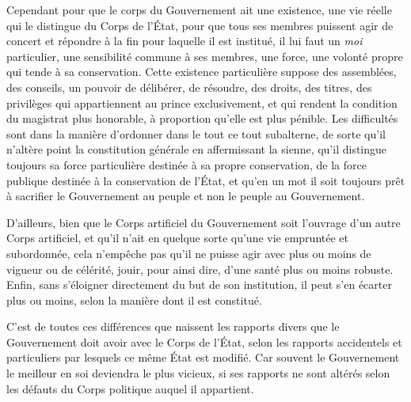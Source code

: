 \documentclass[french,twoside]{book} %
\begin{document}
Cependant pour que le corps du Gouvernement ait une existence, une vie réelle qui le distingue du Corps de l’État, pour que tous ses membres puissent agir de concert et répondre à la fin pour laquelle il est institué, il lui faut un {\itshape moi} particulier, une sensibilité commune à ses membres, une force, une volonté propre qui tende à sa conservation. Cette existence particulière suppose des assemblées, des conseils, un pouvoir de délibérer, de résoudre, des droits, des titres, des privilèges qui appartiennent au prince exclusivement, et qui rendent la condition du magistrat plus honorable, à proportion qu’elle est plus pénible. Les difficultés sont dans la manière d’ordonner dans le tout ce tout subalterne, de sorte qu’il n’altère point la constitution générale en affermissant la sienne, qu’il distingue toujours sa force particulière destinée à sa propre conservation, de la force publique destinée à la conservation de l’État, et qu’en un mot il soit toujours prêt à sacrifier le Gouvernement au peuple et non le peuple au Gouvernement.\par
D’ailleurs, bien que le Corps artificiel du Gouvernement soit l’ouvrage d’un autre Corps artificiel, et qu’il n’ait en quelque sorte qu’une vie empruntée et subordonnée, cela n’empêche pas qu’il ne puisse agir avec plus ou moins de vigueur ou de célérité, jouir, pour ainsi dire, d’une santé plus ou moins robuste. Enfin, sans s’éloigner directement du but de son institution, il peut s’en écarter plus ou moins, selon la manière dont il est constitué.\par
C’est de toutes ces différences que naissent les rapports divers que le Gouvernement doit avoir avec le Corps de l’État, selon les rapports accidentels et particuliers par lesquels ce même État est modifié. Car souvent le Gouvernement le meilleur en soi deviendra le plus vicieux, si ses rapports ne sont altérés selon les défauts du Corps politique auquel il appartient.
\end{document}
